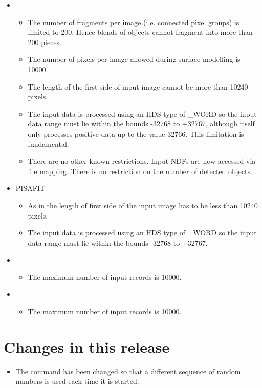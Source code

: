 \begin{itemize}
   \item {}
   \begin{itemize}
      \item The number of fragments per image (i.e. connected pixel groups)
            is limited to 200. Hence blends of objects cannot fragment into
            more than 200 pieces.
      \item The number of pixels per image allowed during surface modelling
            is 10000.
      \item The length of the first side of input image cannot be more than
            10240 pixels.
      \item The input data is processed using an HDS type of \_WORD so the input
            data range must lie within the bounds -32768 to +32767,
            although  itself only processes positive data up to
            the value 32766. This limitation is fundamental.
      \item There are no other known restrictions. Input NDFs are now accessed
            via file mapping. There is no restriction on the number of detected
            objects.
    \end{itemize}
    \item PISAFIT
    \begin{itemize}
       \item As in  the length of first side of the input image
             has to be less than 10240 pixels.
       \item The input data is processed using an HDS type of \_WORD so the input
             data range must lie within the bounds -32768 to +32767.
    \end{itemize}
    \item {}
    \begin{itemize}
       \item The maximum number of input records is 10000.
    \end{itemize}
    \item {}
    \begin{itemize}
       \item The maximum number of input records is 10000.
    \end{itemize}
\end{itemize}

\section{Changes in this release}

\begin{itemize}
    \item The  command has been changed so that a
          different sequence of random numbers is used each time
          it is started.
\end{itemize}


